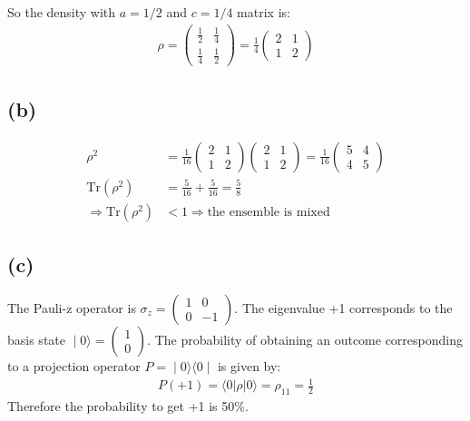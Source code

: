 \documentclass{article}
\begin{document}
So the density with $a=1/2$ and $c=1/4$ matrix is:
\begin{align}
    \rho=
    \begin{pmatrix}
        \frac{1}{2}&\frac{1}{4}\\
        \frac{1}{4}&\frac{1}{2}
    \end{pmatrix}
    =
    \frac{1}{4}
    \begin{pmatrix}
        2&1\\
        1&2
    \end{pmatrix}
\end{align}

\subsection*{(b)}
\begin{align}
    \rho^2&=
    \frac{1}{16}
    \begin{pmatrix}
        2&1\\
        1&2
    \end{pmatrix}
    \begin{pmatrix}
        2&1\\
        1&2
    \end{pmatrix}
    = \frac{1}{16}
    \begin{pmatrix}
        5&4\\
        4&5
    \end{pmatrix}\\[0.2cm]
    \text{Tr}(\rho^2)&=\frac{5}{16}+\frac{5}{16}=\frac{5}{8}\\[0.2cm]
    \Rightarrow\text{Tr}(\rho^2)&<1 \Rightarrow \text{the ensemble is mixed}
\end{align}

\subsection*{(c)}
The Pauli-z operator is $\sigma_z=\begin{pmatrix}
1&0\\
0&-1
\end{pmatrix}$.
The eigenvalue +1 corresponds to the basis state $∣0⟩=\begin{pmatrix}
1\\
0
\end{pmatrix}$.
The probability of obtaining an outcome corresponding to a projection operator $P=∣0⟩⟨0∣$ is given by:
\begin{align}
    P(+1)=\langle0|\rho|0\rangle=\rho_{11}=\frac{1}{2}
\end{align}
Therefore the probability to get +1 is 50\%.
\end{document}

